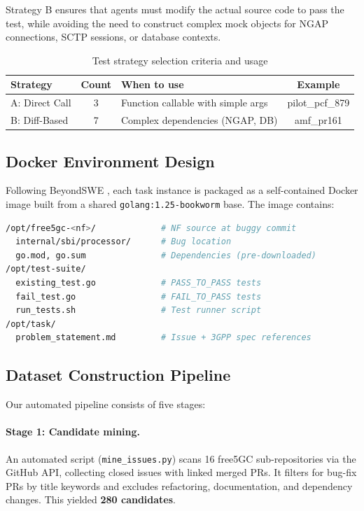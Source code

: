\documentclass{article}
\begin{document}
Strategy B ensures that agents must modify the actual source code to pass the test, while avoiding the need to construct complex mock objects for NGAP connections, SCTP sessions, or database contexts.

\begin{table}[h]
\centering
\caption{Test strategy selection criteria and usage}
\label{tab:strategies}
\begin{tabular}{lcp{5cm}c}
\toprule
\textbf{Strategy} & \textbf{Count} & \textbf{When to use} & \textbf{Example} \\
\midrule
A: Direct Call  & 3 & Function callable with simple args & pilot\_pcf\_879 \\
B: Diff-Based   & 7 & Complex dependencies (NGAP, DB) & amf\_pr161 \\
\bottomrule
\end{tabular}
\end{table}

\subsection{Docker Environment Design}

Following BeyondSWE \citep{shi2025beyondswe}, each task instance is packaged as a self-contained Docker image built from a shared \texttt{golang:1.25-bookworm} base. The image contains:

\begin{lstlisting}[language=bash, caption={Docker image internal structure}]
/opt/free5gc-<nf>/             # NF source at buggy commit
  internal/sbi/processor/      # Bug location
  go.mod, go.sum               # Dependencies (pre-downloaded)
/opt/test-suite/
  existing_test.go             # PASS_TO_PASS tests
  fail_test.go                 # FAIL_TO_PASS tests
  run_tests.sh                 # Test runner script
/opt/task/
  problem_statement.md         # Issue + 3GPP spec references
\end{lstlisting}

\subsection{Dataset Construction Pipeline}

Our automated pipeline consists of five stages:

\paragraph{Stage 1: Candidate mining.} An automated script (\texttt{mine\_issues.py}) scans 16 free5GC sub-repositories via the GitHub API, collecting closed issues with linked merged PRs. It filters for bug-fix PRs by title keywords and excludes refactoring, documentation, and dependency changes. This yielded \textbf{280 candidates}.
\end{document}
